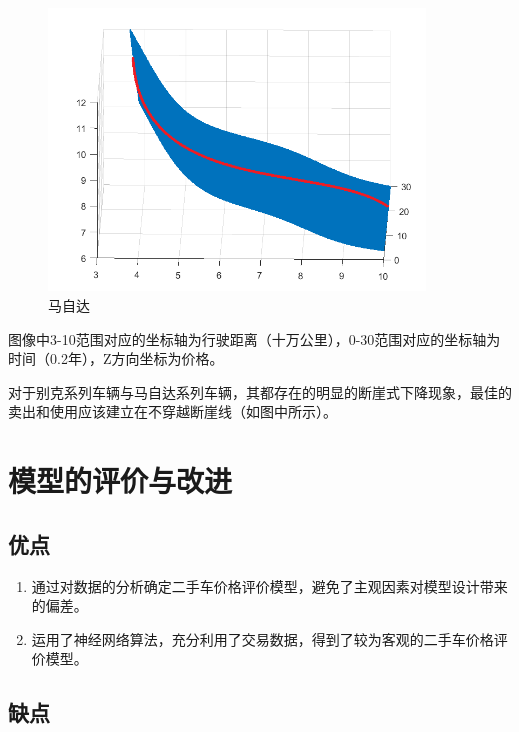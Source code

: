 \documentclass{ctexart}
\newcounter{sub}
\begin{document}
\renewcommand\figurename{图}
\begin{figure}[H]
	\centering
	\includegraphics[width=10cm]{for.png}
	\caption{马自达} \label{all}
\end{figure}

图像中3-10范围对应的坐标轴为行驶距离（十万公里），0-30范围对应的坐标轴为时间（0.2年），Z方向坐标为价格。

对于别克系列车辆与马自达系列车辆，其都存在的明显的断崖式下降现象，最佳的卖出和使用应该建立在不穿越断崖线（如图中所示）。



\newpage

\section{模型的评价与改进}%
\label{sec:模型的评价与改进}

\subsection{优点}%
\label{sub:优点}
\begin{enumerate}
	\item 通过对数据的分析确定二手车价格评价模型，避免了主观因素对模型设计带来的偏差。
	\item  运用了神经网络算法，充分利用了交易数据，得到了较为客观的二手车价格评价模型。
\end{enumerate}

\subsection{缺点}%
\label{sub:缺点}
\end{document}
